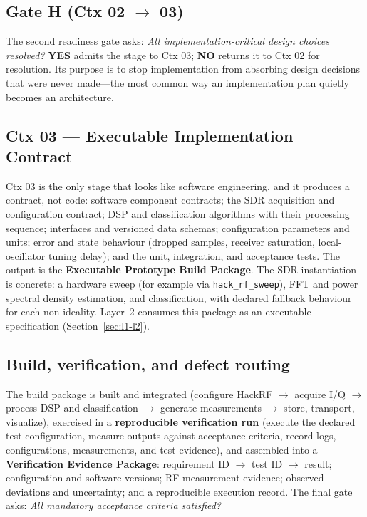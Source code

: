 \documentclass[11pt,a4paper]{article}
\begin{document}
\subsection{Gate H (Ctx 02 $\rightarrow$ 03)}
\label{sec:gate-h2}

The second readiness gate asks: \emph{All implementation-critical design choices resolved?}
\textbf{YES} admits the stage to Ctx 03; \textbf{NO} returns it to Ctx 02 for resolution. Its
purpose is to stop implementation from absorbing design decisions that were never made---the
most common way an implementation plan quietly becomes an architecture.

\subsection{Ctx 03 --- Executable Implementation Contract}
\label{sec:ctx03}

Ctx 03 is the only stage that looks like software engineering, and it produces a contract, not
code: software component contracts; the SDR acquisition and configuration contract; DSP and
classification algorithms with their processing sequence; interfaces and versioned data schemas;
configuration parameters and units; error and state behaviour (dropped samples, receiver
saturation, local-oscillator tuning delay); and the unit, integration, and acceptance tests. The
output is the \textbf{Executable Prototype Build Package}. The SDR instantiation is concrete: a
hardware sweep (for example via \texttt{hack\_rf\_sweep}), FFT and power spectral density
estimation, and classification, with declared fallback behaviour for each non-ideality. Layer~2
consumes this package as an executable specification (Section~\ref{sec:l1-l2}).

\subsection{Build, verification, and defect routing}
\label{sec:routing}

The build package is built and integrated (configure HackRF $\rightarrow$ acquire I/Q $\rightarrow$
process DSP and classification $\rightarrow$ generate measurements $\rightarrow$ store, transport,
visualize), exercised in a \textbf{reproducible verification run} (execute the declared test
configuration, measure outputs against acceptance criteria, record logs, configurations,
measurements, and test evidence), and assembled into a \textbf{Verification Evidence Package}:
requirement ID $\rightarrow$ test ID $\rightarrow$ result; configuration and software versions;
RF measurement evidence; observed deviations and uncertainty; and a reproducible execution
record. The final gate asks: \emph{All mandatory acceptance criteria satisfied?}
\end{document}
